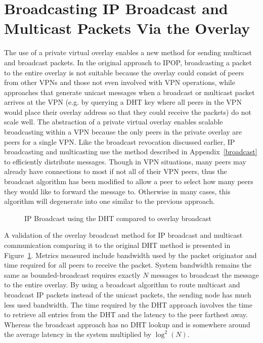 \section{Broadcasting IP Broadcast and Multicast Packets Via the Overlay}

The use of a private virtual overlay enables a new method for sending multicast
and broadcast packets. In the original approach to IPOP, broadcasting a packet
to the entire overlay  is not suitable because the overlay could consist of
peers from other VPNs and those not even involved with VPN operations, while
approaches that generate unicast messages when a broadcast or multicast packet
arrives at the VPN (e.g. by querying a DHT key where all peers in the VPN would
place their overlay address so that they could receive the packets) do not
scale well. The abstraction of a private virtual overlay enables scalable
broadcasting within a VPN because the only peers in the private overlay are
peers for a single VPN.  Like the broadcast revocation discussed earlier, IP
broadcasting and multicasting use the method described in
Appendix~\ref{broadcast} to efficiently distribute messages.  Though in VPN
situations, many peers may already have connections to most if not all of their
VPN peers, thus the broadcast algorithm has been modified to allow a peer to
select how many peers they would like to forward the message to.  Otherwise in
many cases, this algorithm will degenerate into one similar to the previous
approach.  

\begin{figure}
\centering
\caption{IP Broadcast using the DHT compared to overlay broadcast}
\label{fig:ipbroadcast}
\end{figure}

A validation of the overlay broadcast method for IP broadcast and multicast
communication comparing it to the original DHT method is presented in
Figure~\ref{fig:ipbroadcast}.  Metrics measured include bandwidth used by the
packet originator and time required for all peers to receive the packet.
System bandwidth remains the same as bounded-broadcast requires exactly $N$
messages to broadcast the message to the entire overlay.  By using a broadcast
algorithm to route multicast and broadcast IP packets instead of the unicast
packets, the sending node has much less used bandwidth.  The time required by
the DHT approach involves the time to retrieve all entries from the DHT and the
latency to the peer farthest away.  Whereas the broadcast approach has no DHT
lookup and is somewhere around the average latency in the system multiplied by
$\log^2(N)$.

